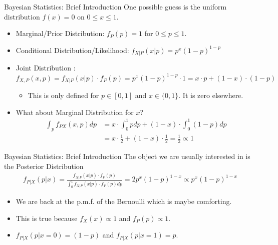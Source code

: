 \documentclass[aspectratio=169]{beamer}
\begin{document}
\begin{frame}{Bayesian Statistics: Brief Introduction}
One possible guess is the uniform distribution $f(x) = 0$ on $0 \leq x \leq 1$.
\begin{itemize}
\item \alert{Marginal/Prior Distribution}: $f_P(p) = 1$ for $0 \leq p \leq 1$.
\item \alert{Conditional Distribution}/Likelihood: $f_{X|P} (x | p) = p^x (1-p)^{1-p}$
\item \alert{Joint Distribution} : $f_{X,P}(x, p)=f_{X|P}(x | p)\cdot f_P(p)  = p^x (1-p)^{1-p}\cdot 1 = x \cdot p + (1-x) \cdot (1-p)$
\begin{itemize}
\item This is only defined for $p \in[0,1]$ and $x \in \{0,1\}$. It is zero elsewhere.
\end{itemize}
\item What about \alert{Marginal Distribution} for $x$?
\begin{align*}
\int _ { p } f _ { P X } ( x , p ) d p &= x \cdot \int _ { 0 } ^ { 1 } p d p + ( 1 - x ) \cdot \int _ { 0 } ^ { 1 } ( 1 - p ) d p \\
&= x \cdot \frac { 1 } { 2 } + ( 1 - x ) \cdot \frac { 1 } { 2 } = \frac { 1 } { 2 } \propto 1
\end{align*}
\end{itemize}
\end{frame}


\begin{frame}{Bayesian Statistics: Brief Introduction}
The object we are usually interested in is the \alert{Posterior Distribution}
\begin{align*}
f _ { P | X } ( p | x ) = \frac { f _ { X | P } ( x | p ) \cdot f _ { P } ( p ) } { \int _ { 0 } ^ { 1 } f _ { X | P } ( x | p ) \cdot f _ { P } ( p ) d p } = 2 p ^ { x } ( 1 - p ) ^ { 1 - x } \propto p ^ { x } ( 1 - p ) ^ { 1 - x }
\end{align*}
\begin{itemize}
\item We are back at the p.m.f. of the \alert{Bernoulli} which is maybe comforting.\\
\item This is true because $f_X(x) \propto 1$ and $f_P(p) \propto 1$.
\item $f _ { P | X } ( p | x=0) = (1-p)$ and $f _ { P | X } ( p | x =1)=p$.
\end{itemize}
\end{frame}
\end{document}
